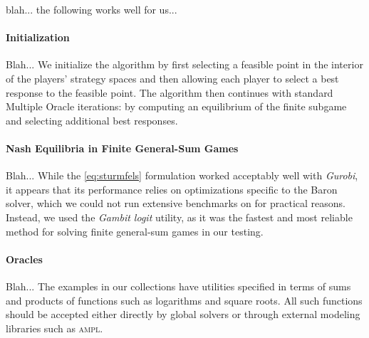 blah... the following works well for us...

\paragraph{Initialization}
Blah... We initialize the algorithm by first selecting a feasible point in the interior of the players' strategy spaces and then allowing each player to select a best response to the feasible point. The algorithm then continues with standard Multiple Oracle iterations: by computing an equilibrium of the finite subgame and selecting additional best responses.

\paragraph{Nash Equilibria in Finite General-Sum Games}
Blah... While the \ref{eq:sturmfels} formulation worked acceptably well with \emph{Gurobi}, it appears that its performance relies on optimizations specific to the Baron solver, which we could not run extensive benchmarks on for practical reasons. Instead, we used the \emph{Gambit logit} utility, as it was the fastest and most reliable method for solving finite general-sum games in our testing.

\paragraph{Oracles}
Blah... The examples in our collections have utilities specified in terms of sums and products of functions such as logarithms and square roots. All such functions should be accepted either directly by global solvers or through external modeling libraries such as \textsc{ampl}.